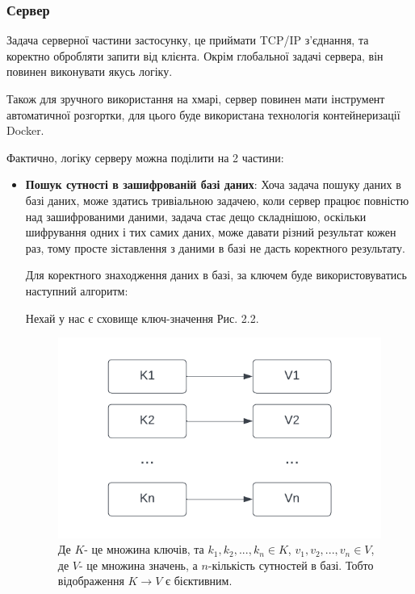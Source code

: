 \subsubsection*{Сервер}
Задача серверної частини застосунку, це приймати TCP/IP з'єднання, та коректно обробляти 
запити від клієнта. Окрім глобальної задачі сервера, він повинен виконувати якусь логіку.

Також для зручного використання на хмарі, сервер повинен мати інструмент автоматичної розгортки,
для цього буде використана технологія контейнеризації Docker.

Фактично, логіку серверу можна поділити на 2 частини:
\begin{itemize}
    \item{\textbf{Пошук сутності в зашифрованій базі даних}: Хоча задача пошуку даних в базі
даних, може здатись тривіальною задачею, коли сервер працює повністю над зашифрованими даними,
задача стає дещо складнішою, оскільки шифрування одних і тих самих даних, може давати різний
результат кожен раз, тому просте зіставлення з даними в базі не дасть коректного результату.

Для коректного знаходження даних в базі, за ключем буде використовуватись наступний алгоритм:

Нехай у нас є сховище ключ-значення Рис. 2.2.


\begin{figure}[!ht]
    \centering
    \label{fig:key-value-storage}
    \includegraphics[scale=1.25]{static/key-value-storage.png}
    \caption{Де \(K\)- це множина ключів, та \(k_1,k_2,...,k_n \in K\), \(v_1, v_2,...,v_n 
    \in V\), де \(V\)- це множина значень, а \(n\)-кількість сутностей в базі. Тобто
    відображення \(K \rightarrow V\) є бієктивним.}
\end{figure}

}
\end{itemize}
